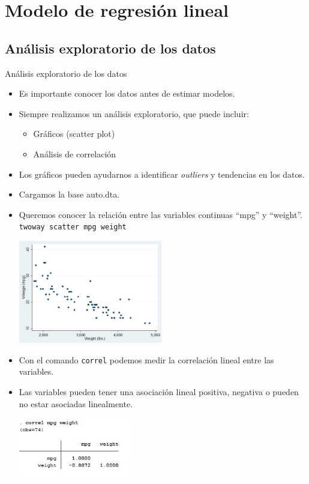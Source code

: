\documentclass{beamer}
\begin{document}
\section{Modelo de regresión lineal}
\subsection{Análisis exploratorio de los datos}
\begin{frame}[allowframebreaks]{Análisis exploratorio de los datos}
\begin{itemize}
\item Es importante conocer los datos antes de estimar modelos.
\item Siempre realizamos un análisis exploratorio, que puede incluir: 
\begin{itemize}
\item Gráficos (scatter plot)
\item Análisis de correlación
\end{itemize}
\item Los gráficos pueden ayudarnos a identificar \textit{outliers} y tendencias en los datos.
\item Cargamos la base auto.dta.
\item Queremos conocer la relación entre las variables continuas ``mpg'' y ``weight''. \\\bigskip
\texttt{twoway scatter mpg weight}
\begin{center}
\includegraphics[height=4.5cm]{scatter.jpg}
\end{center}
\item Con el comando \texttt{correl} podemos medir la correlación lineal entre las variables. 
\item Las variables pueden tener una asociación lineal positiva, negativa o pueden no estar asociadas linealmente. \\\smallskip
\begin{center}
\includegraphics[height=2.7cm]{correl.jpg}

\end{center}
\end{itemize}
\end{frame}
\end{document}
